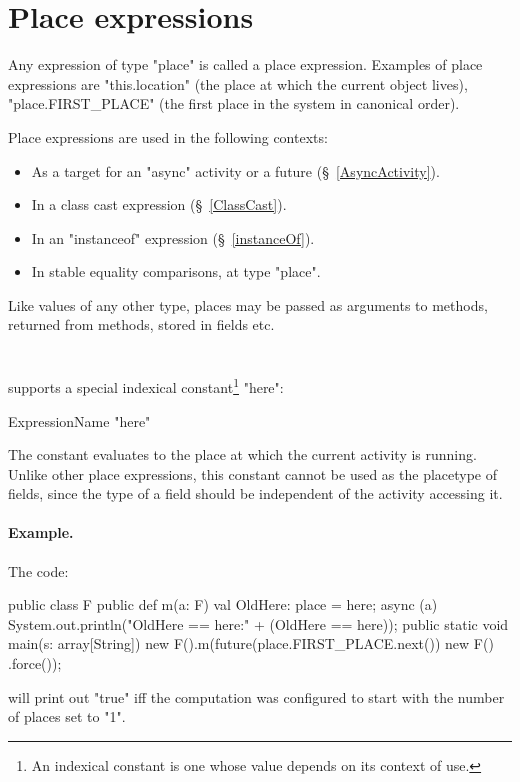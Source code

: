 \section{Place expressions}
Any expression of type \xcd"place" is called a place expression. 
Examples of place expressions are \xcd"this.location" (the place
at which the current object lives), \xcd"place.FIRST_PLACE"
(the first place in the system in canonical order). 

Place expressions are used in the following contexts: 
\begin{itemize}
\item As a target for an \xcd"async" activity or a future
(\S~\ref{AsyncActivity}).
\item In a class cast expression  (\S~\ref{ClassCast}).
\item In an \xcd"instanceof" expression (\S~\ref{instanceOf}).
\item In stable equality comparisons, at type \xcd"place".
\end{itemize}

Like values of any other type, places may be passed as arguments
to methods, returned from methods, stored in fields etc.

\section{}\label{Here}
\Xten{} supports a special indexical constant\footnote{
An indexical constant is one whose value depends on its context
of use.} \xcd"here":
\begin{grammar}
ExpressionName \: \xcd"here" \\
\end{grammar}
The constant evaluates to the place at which the current activity is
running. Unlike other place expressions, this constant cannot be 
used as the placetype of fields, since the type of a field 
should be independent of the activity accessing it.

\paragraph{Example.}
The code:
\begin{xten}
public class F {
  public def m(a: F) {
    val OldHere: place = here;
    async (a) {
      System.out.println("OldHere == here:" 
                         + (OldHere == here));
    }
  }
  public static void main(s: array[String]) {
    new F().m(future(place.FIRST_PLACE.next())
              { new F() }.force());
  }
}  
\end{xten}
\noindent will print out \xcd"true" iff the computation was configured
to start with the number of places set to \xcd"1". 


